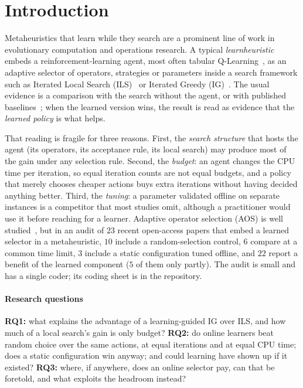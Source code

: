 \section{Introduction}
\label{sec:intro}
Metaheuristics that learn while they search are a prominent line of work in evolutionary computation and operations research. A typical \emph{learnheuristic}~\cite{CalvetEtal2017} embeds a reinforcement-learning agent, most often tabular Q-Learning~\cite{WatkinsDayan1992,SuttonBarto2018}, as an adaptive selector of operators, strategies or parameters inside a search framework such as Iterated Local Search (ILS)~\cite{LourencaoEtal2019} or Iterated Greedy (IG)~\cite{RuizStutzle2007}. The usual evidence is a comparison with the search without the agent, or with published baselines~\cite{KarimiMamaghanEtal2023,MissaouiOSullivan2026}; when the learned version wins, the result is read as evidence that the \emph{learned policy} is what helps.

That reading is fragile for three reasons. First, the \emph{search structure} that hosts the agent (its operators, its acceptance rule, its local search) may produce most of the gain under any selection rule. Second, the \emph{budget}: an agent changes the CPU time per iteration, so equal iteration counts are not equal budgets, and a policy that merely chooses cheaper actions buys extra iterations without having decided anything better. Third, the \emph{tuning}: a parameter validated offline on separate instances is a competitor that most studies omit, although a practitioner would use it before reaching for a learner. Adaptive operator selection (AOS) is well studied~\cite{FialhoEtal2010,PisingerRopke2007}, but in an audit of $23$ recent open-access papers that embed a learned selector in a metaheuristic, $10$ include a random-selection control, $6$ compare at a common time limit, $3$ include a static configuration tuned offline, and $22$ report a benefit of the learned component ($5$ of them only partly). The audit is small and has a single coder; its coding sheet is in the repository.

\paragraph{Research questions} \textbf{RQ1:} what explains the advantage of a learning-guided IG over ILS, and how much of a local search's gain is only budget? \textbf{RQ2:} do online learners beat random choice over the same actions, at equal iterations and at equal CPU time; does a static configuration win anyway; and could learning have shown up if it existed? \textbf{RQ3:} where, if anywhere, does an online selector pay, can that be foretold, and what exploits the headroom instead?

